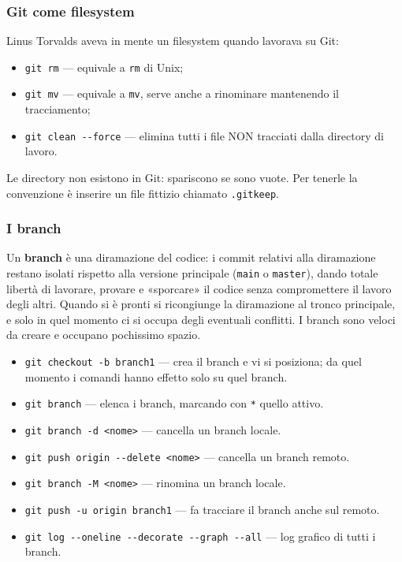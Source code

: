 \documentclass[a4paper,12pt]{article}
\begin{document}
\subsubsection{Git come filesystem}

Linus Torvalds aveva in mente un filesystem quando lavorava su Git:
\begin{itemize}
  \item \verb|git rm| --- equivale a \texttt{rm} di Unix;
  \item \verb|git mv| --- equivale a \texttt{mv}, serve anche a rinominare mantenendo il
        tracciamento;
  \item \verb|git clean --force| --- elimina tutti i file NON tracciati dalla directory
        di lavoro.
\end{itemize}
Le directory non esistono in Git: spariscono se sono vuote. Per tenerle la convenzione è
inserire un file fittizio chiamato \texttt{.gitkeep}.


\subsubsection{I branch}

Un \textbf{branch} è una diramazione del codice: i commit relativi alla diramazione
restano isolati rispetto alla versione principale (\texttt{main} o \texttt{master}),
dando totale libertà di lavorare, provare e «sporcare» il codice senza compromettere il
lavoro degli altri. Quando si è pronti si ricongiunge la diramazione al tronco
principale, e solo in quel momento ci si occupa degli eventuali conflitti. I branch sono
veloci da creare e occupano pochissimo spazio.

\begin{itemize}
  \item \verb|git checkout -b branch1| --- crea il branch e vi si posiziona; da quel
        momento i comandi hanno effetto solo su quel branch.
  \item \verb|git branch| --- elenca i branch, marcando con \texttt{*} quello attivo.
  \item \verb|git branch -d <nome>| --- cancella un branch locale.
  \item \verb|git push origin --delete <nome>| --- cancella un branch remoto.
  \item \verb|git branch -M <nome>| --- rinomina un branch locale.
  \item \verb|git push -u origin branch1| --- fa tracciare il branch anche sul remoto.
  \item \verb|git log --oneline --decorate --graph --all| --- log grafico di tutti i
        branch.
\end{itemize}
\end{document}
